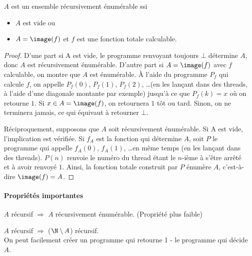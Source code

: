 \begin{myprop}
	$A$ est un ensemble récursivement énumérable ssi
    \begin{itemize}
      \item $A$ est vide ou
      \item $A = \image(f)$ et $f$ est une fonction totale calculable.
    \end{itemize}

    \begin{proof}
      D'une part si A est vide, le programme renvoyant toujours $\bot$ détermine $A$, donc $A$ est récursivement énumérable. D'autre part si $A=\image(f)$ avec $f$ calculable, on montre que $A$ est énumérable. À l'aide du programme $P_f$ qui calcule $f$, on appelle $P_f(0)$, $P_f(1)$, $P_f(2)$, \dots (en les lançant dans des threads, à l'aide d'une diagonale montante par exemple) jusqu'à ce que $P_f(k) = x$ où on retourne $1$. Si $x \in A=\image(f)$, on retournera $1$ tôt ou tard. Sinon, on ne terminera jamais, ce qui équivaut à retourner $\bot$.
      
      
      Réciproquement, supposons que $A$ soit récursivement énumérable. Si A est vide, l'implication est vérifiée. Si $f_A$ est la fonction qui détermine $A$, soit $P$ le programme qui appelle $f_A(0)$, $f_A(1)$, \dots en même temps (en les lançant dans des threads). $P(n)$ renvoie le numéro du thread étant le $n$-ième à s'être arrêté et à avoir renvoyé $1$. Ainsi, la fonction totale construit par $P$ énumère $A$, c'est-à-dire $\image(f) =A$.
    \end{proof}
\end{myprop}


\paragraph{Propriétés importantes}
\label{par:propri_t_s_importantes}
\begin{myprop}
\label{prop:recursif_implique_recursivement_enumerable}
	$A$ récursif $\Rightarrow$ $A$ récursivement énumérable. (Propriété plus
		faible)
\end{myprop}

\begin{myprop}
	$A$ récursif $\Rightarrow$ ($\N \setminus A$) récursif.\\ On peut facilement créer
		un programme qui retourne 1 - le programme qui décide $A$.
\end{myprop}

